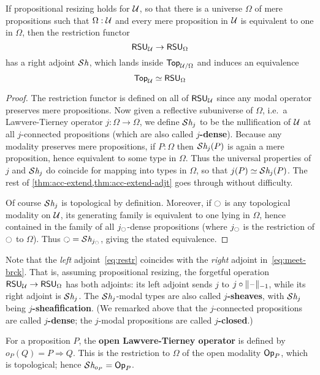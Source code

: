 \begin{thm}\label{thm:tpl-extend}
  If propositional resizing holds for $\UU$, so that there is a universe $\Omega$ of mere propositions such that $\Omega:\UU$ and every mere proposition in $\UU$ is equivalent to one in $\Omega$, then the restriction functor
  \begin{equation}
    \rsu[\UU] \to \rsu[\Omega]\label{eq:restr}
  \end{equation}
  has a right adjoint $\shmod{}$, which lands inside $\tpl[\UU/\Omega]$ and induces an equivalence
  \[ \tpl[\UU] \eqvsym \rsu[\Omega] \]
\end{thm}
\begin{proof}
  The restriction functor is defined on all of $\rsu[\UU]$ since any modal operator preserves mere propositions.
  Now given a reflective subuniverse of $\Omega$, i.e.\ a Lawvere-Tierney operator $j:\Omega\to\Omega$, we define $\shmod{j}$ to be the nullification of $\UU$ at all $j$-connected propositions (which are also called \textbf{$j$-dense}).
  Because any modality preserves mere propositions, if $P:\Omega$ then $\shmod{j}(P)$ is again a mere proposition, hence equivalent to some type in $\Omega$.
  Thus the universal properties of $j$ and $\shmod{j}$ do coincide for mapping into types in $\Omega$, so that $j(P) \eqvsym \shmod{j}(P)$.
  The rest of \cref{thm:acc-extend,thm:acc-extend-adjt} goes through without difficulty.

  Of course $\shmod{j}$ is topological by definition.
  Moreover, if $\modal$ is any topological modality on $\UU$, its generating family is equivalent to one lying in $\Omega$, hence contained in the family of all $j_\modal$-dense propositions (where $j_\modal$ is the restriction of $\modal$ to $\Omega$).
  Thus $\modal = \shmod{j_\modal}$, giving the stated equivalence.
\end{proof}

Note that the \emph{left} adjoint~\eqref{eq:restr} coincides with the \emph{right} adjoint in~\eqref{eq:meet-brck}.
That is, assuming propositional resizing, the forgetful operation $\rsu[\UU] \to \rsu[\Omega]$ has both adjoints: its left adjoint sends $j$ to $j\circ \truncf{-1}$, while its right adjoint is $\shmod{j}$.
The $\shmod j$-modal types are also called \textbf{$j$-sheaves}, with $\shmod j$ being \textbf{$j$-sheafification}.
(We remarked above that the $j$-connected propositions are called \textbf{$j$-dense}; the $j$-modal propositions are called \textbf{$j$-closed}.)

\begin{eg}
  For a proposition $P$, the \textbf{open Lawvere-Tierney operator} is defined by $o_P(Q) = P\Rightarrow Q$.
  This is the restriction to $\Omega$ of the open modality $\open P$, which is topological; hence $\shmod{o_P} = \open P$.
\end{eg}

